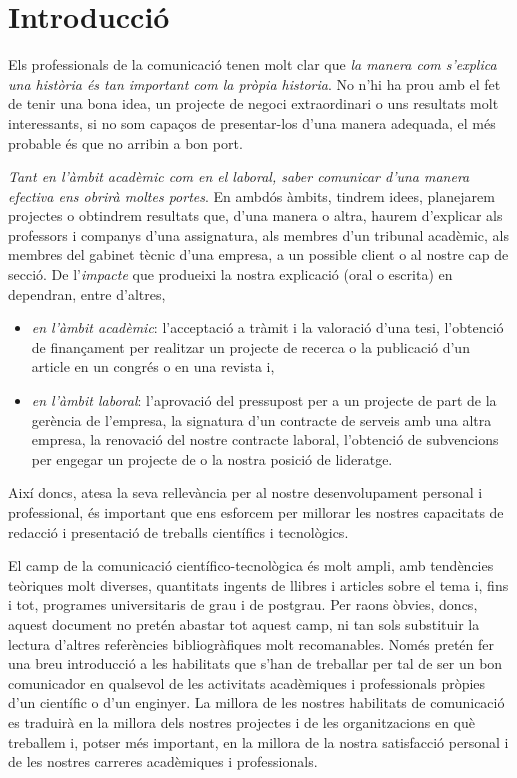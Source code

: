 
\chapter{Introducció}

Els professionals de la comunicació tenen molt clar que \emph{la manera com s'explica una història és tan important com la pròpia historia}. No n'hi ha prou amb el fet de tenir una bona idea, un projecte de negoci extraordinari o uns resultats molt interessants, si no som capaços de presentar-los d'una manera adequada, el més probable és que no arribin a bon port.

\emph{Tant en l'àmbit acadèmic com en el laboral, saber comunicar d'una manera efectiva ens obrirà moltes portes}. En ambdós àmbits, tindrem idees, planejarem projectes o obtindrem resultats que, d'una manera o altra, haurem d'explicar als professors i companys d'una assignatura, als membres d'un tribunal acadèmic, als membres del gabinet tècnic d'una empresa, a un possible client o al nostre cap de secció. De l'\emph{impacte} que produeixi la nostra explicació (oral o escrita) en dependran, entre d'altres,
\begin{itemize}
 \item \emph{en l'àmbit acadèmic}: l'acceptació a tràmit i la valoració d'una tesi, l'obtenció de finançament per realitzar un projecte de recerca o la publicació d'un article en un congrés o en una revista i,
 \item \emph{en l'àmbit laboral}: l'aprovació del pressupost per a un projecte de part de la gerència de l'empresa, la signatura d'un contracte de serveis amb una altra empresa, la renovació del nostre contracte laboral, l'obtenció de subvencions per engegar un projecte de  o la nostra posició de lideratge.
\end{itemize}
Així doncs, atesa la seva rellevància per al nostre desenvolupament personal i professional, és important que ens esforcem per millorar les nostres capacitats de redacció i presentació de treballs científics i tecnològics.

El camp de la comunicació científico-tecnològica és molt ampli, amb tendències teòriques molt diverses, quantitats ingents de llibres i articles sobre el tema i, fins i tot, programes universitaris de grau i de postgrau. Per raons òbvies, doncs, aquest document no pretén abastar tot aquest camp, ni tan sols substituir la lectura d'altres referències bibliogràfiques molt recomanables. Només pretén fer una breu introducció a les habilitats que s'han de treballar per tal de ser un bon comunicador en qualsevol de les activitats acadèmiques i professionals pròpies d'un científic o d'un enginyer. La millora de les nostres habilitats de comunicació es traduirà en la millora dels nostres projectes i de les organitzacions en què treballem i, potser més important, en la millora de la nostra satisfacció personal i de les nostres carreres acadèmiques i professionals.

